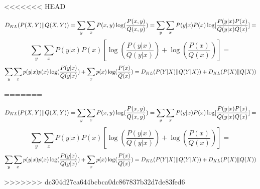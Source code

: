 <<<<<<< HEAD
\begin{answer}
$$ D_{KL}(P(X,Y)\|Q(X,Y)) = \sum_y \sum_x P(x,y) \log(\frac{P(x,y)}{Q(x,y)}) = \sum_y \sum_x P(y|x)P(x) \log[\frac{P(y|x)P(x)}{Q(y|x)Q(x)}] = $$
$$\sum_y \sum_x P(y|x)P(x) [\log(\frac{P(y|x)}{Q(y|x)}) + \log(\frac{P(x)}{Q(x)})] = $$
$$\sum_y \sum_x p(y|x)p(x)\log(\frac{P(y|x)}{Q(y|x)}) + \sum_x p(x) \log(\frac{P(x)}{Q(x)}) =  D_{KL}(P(Y|X)\|Q(Y|X)) + D_{KL}(P(X)\|Q(X)) $$
\end{answer}
=======
\begin{answer}
$$ D_{KL}(P(X,Y)\|Q(X,Y)) = \sum_y \sum_x P(x,y) \log(\frac{P(x,y)}{Q(x,y)}) = \sum_y \sum_x P(y|x)P(x) \log[\frac{P(y|x)P(x)}{Q(y|x)Q(x)}] = $$
$$\sum_y \sum_x P(y|x)P(x) [\log(\frac{P(y|x)}{Q(y|x)}) + \log(\frac{P(x)}{Q(x)})] = $$
$$\sum_y \sum_x p(y|x)p(x)\log(\frac{P(y|x)}{Q(y|x)}) + \sum_x p(x) \log(\frac{P(x)}{Q(x)}) =  D_{KL}(P(Y|X)\|Q(Y|X)) + D_{KL}(P(X)\|Q(X)) $$
\end{answer}
>>>>>>> dc304d27ca644bcbca0dc867837b32d7de83fed6
